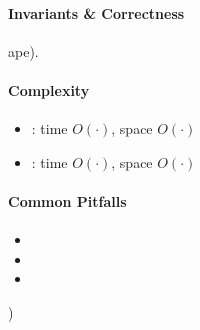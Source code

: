 \paragraph{Invariants \& Correctness}
ape).

\paragraph{Complexity}
\begin{itemize}[nosep]
  \item <op1>: time $O(\cdot)$, space $O(\cdot)$
  \item <op2>: time $O(\cdot)$, space $O(\cdot)$
\end{itemize}

\paragraph{Common Pitfalls}
\begin{itemize}[nosep]
  \item <Pitfall 1>
  \item <Pitfall 2>
  \item <Pitfall 3>
\end{itemize}

)

% 

% 
